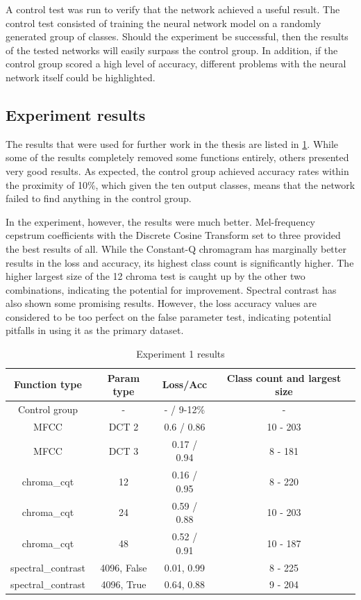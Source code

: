A control test was run to verify that the network achieved a useful result.
The control test consisted of training the neural network model on a randomly generated group of classes.
Should the experiment be successful, then the results of the tested networks will easily surpass the control group.
In addition, if the control group scored a high level of accuracy, different problems with the neural network itself could be highlighted.

\subsection{Experiment results}

The results that were used for further work in the thesis are listed in \cref{tab:ex1results}.
While some of the results completely removed some functions entirely, others presented very good results.
As expected, the control group achieved accuracy rates within the proximity of 10\%, which given the ten output classes, means that the network failed to find anything in the control group.

In the experiment, however, the results were much better.
Mel-frequency cepstrum coefficients with the Discrete Cosine Transform set to three provided the best results of all.
While the Constant-Q chromagram has marginally better results in the loss and accuracy, its highest class count is significantly higher.
The higher largest size of the 12 chroma test is caught up by the other two combinations, indicating the potential for improvement.
Spectral contrast has also shown some promising results. 
However, the loss accuracy values are considered to be too perfect on the false parameter test, indicating potential pitfalls in using it as the primary dataset.

\begin{table}[ht]
    \centering
    \begin{tabular}{|c|c|c|c|}
        \hline
        Function type & Param type & Loss/Acc & Class count and largest size\\ \hline
        Control group & - & - / 9-12\% & - \\ \hline
        MFCC & DCT 2 & 0.6 / 0.86 & 10 - 203\\ \hline
        MFCC & DCT 3 & 0.17 / 0.94 & 8 - 181\\ \hline
        chroma\_cqt & 12 & 0.16 / 0.95 & 8 - 220\\ \hline
        chroma\_cqt & 24 & 0.59 / 0.88 & 10 - 203\\ \hline
        chroma\_cqt & 48 & 0.52 / 0.91 & 10 - 187\\ \hline
        spectral\_contrast & 4096, False & 0.01, 0.99 & 8 - 225\\ \hline
        spectral\_contrast & 4096, True & 0.64, 0.88 & 9 - 204\\ \hline
    \end{tabular}
    \caption{Experiment 1 results}
    \label{tab:ex1results}
\end{table}

